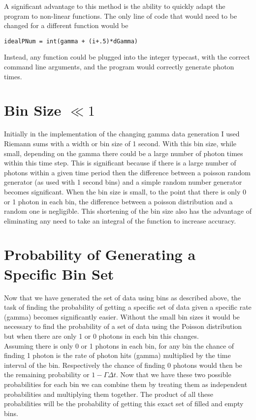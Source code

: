 \documentclass[aps,letterpaper,10pt]{revtex4}
\begin{document}
A significant advantage to this method is the ability to quickly adapt the program to non-linear functions. The only line of code that would need to be changed for a different function would be
\begin{verbatim}
idealPNum = int(gamma + (i+.5)*dGamma)
\end{verbatim}
Instead, any function could be plugged into the integer typecast, with the correct command line arguments, and the program would correctly generate photon times.

\vspace{3mm}


\section{Bin Size $\ll1$}
Initially in the implementation of the changing gamma data generation I used Riemann sums with a width or bin size of 1 second. With this bin size, while small, depending on the gamma there could be a large number of photon times within this time step. This is significant because if there is a large number of photons within a given time period then the difference between a poisson random generator (as used with 1 second bins) and a simple random number generator becomes significant. When the bin size is small, to the point that there is only 0 or 1 photon in each bin, the difference between a poisson distribution and a random one is negligible. This shortening of the bin size also has the advantage of eliminating any need to take an integral of the function to increase accuracy.


\section{Probability of Generating a Specific Bin Set}
Now that we have generated the set of data using bins as described above, the task of finding the probability of getting a specific set of data given a specific rate (gamma) becomes significantly easier. Without the small bin sizes it would be necessary to find the probability of a set of data using the Poisson distribution but when there are only 1 or 0 photons in each bin this changes.\\

Assuming there is only 0 or 1 photons in each bin, for any bin the chance of finding 1 photon is the rate of photon hits (gamma) multiplied by the time interval of the bin. Respectively the chance of finding 0 photons would then be the remaining probability or $1-\Gamma\Delta t$. Now that we have these two possible probabilities for each bin we can combine them by treating them as independent probabilities and multiplying them together. The product of all these probabilities will be the probability of getting this exact set of filled and empty bins.\\
\end{document}
